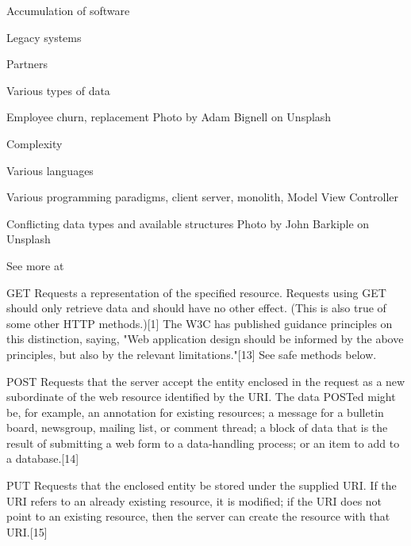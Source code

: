 \documentclass[Screen16to9,17pt]{foils}
\begin{document}


\begin{list2}
\item Accumulation of software
\item Legacy systems
\item Partners
\item Various types of data
\item Employee churn, replacement \hfill Photo by Adam Bignell on Unsplash
\end{list2}




\begin{list2}
\item Complexity
\item Various languages
\item Various programming paradigms, client server, monolith, Model View Controller
\item Conflicting data types and available structures \hfill Photo by John Barkiple on Unsplash
\end{list2}








See more at 


\begin{list2}
\item [GET]
Requests a representation of the specified resource. Requests using GET should only retrieve data and should have no other effect. (This is also true of some other HTTP methods.)[1] The W3C has published guidance principles on this distinction, saying, "Web application design should be informed by the above principles, but also by the relevant limitations."[13] See safe methods below.
\item [POST]
Requests that the server accept the entity enclosed in the request as a new subordinate of the web resource identified by the URI. The data POSTed might be, for example, an annotation for existing resources; a message for a bulletin board, newsgroup, mailing list, or comment thread; a block of data that is the result of submitting a web form to a data-handling process; or an item to add to a database.[14]
\item [PUT]
Requests that the enclosed entity be stored under the supplied URI. If the URI refers to an already existing resource, it is modified; if the URI does not point to an existing resource, then the server can create the resource with that URI.[15]
\end{list2}
\end{document}
